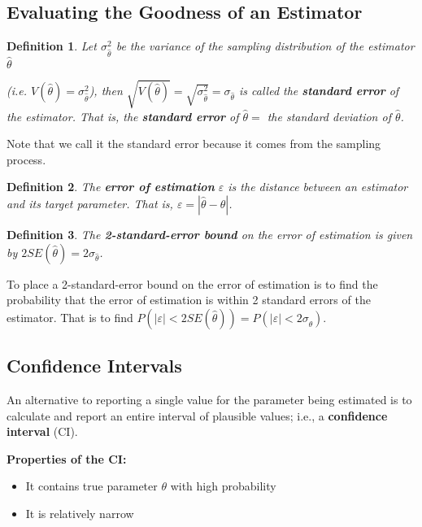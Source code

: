 \documentclass[a4paper,12pt]{article}
\theoremstyle{nonitalic}
\newtheorem{definition}{Definition}[subsection]
\begin{document}
    \subsection{Evaluating the Goodness of an Estimator}

    \begin{definition}
        Let \(\sigma^2_{\hat{\theta}}\) be the variance of the sampling distribution of the estimator \(\hat{\theta}\)

        (i.e. \(V(\hat{\theta}) = \sigma^2_{\hat{\theta}}\)), then \(\sqrt{V(\hat{\theta})} = \sqrt{\sigma^2_{\hat{\theta}}} = \sigma_{\hat{\theta}}\) is called the \textbf{standard error} of the estimator. That is, the \textbf{standard error} of \(\hat{\theta} =\) the standard deviation of \(\hat{\theta}\).
    \end{definition}
    Note that we call it the standard error because it comes from the sampling process.

    \bigskip

    \begin{definition}
        The \textbf{error of estimation} \(\varepsilon\) is the distance between an estimator and its target parameter. That is, \(\varepsilon = |\hat{\theta} - \theta|\).
    \end{definition}

    \bigskip

    \begin{definition}
        The \textbf{2-standard-error bound} on the error of estimation is given by $2SE(\hat{\theta}) = 2\sigma_{\hat{\theta}}$.
    \end{definition}
    To place a 2-standard-error bound on the error of estimation is to find the probability that the error of estimation is within 2 standard errors of the estimator. That is to find $P(|\varepsilon| < 2SE(\hat{\theta})) = P(|\varepsilon| < 2 \sigma_{\hat{\theta}})$.

    \newpage

    \subsection{Confidence Intervals}

    An alternative to reporting a single value for the parameter being estimated is to calculate and report an entire interval of plausible values; i.e., a \textbf{confidence interval} (CI).

    \textbf{Properties of the CI:}

    \begin{itemize}
        \item It contains true parameter \(\theta\) with high probability
        \item It is relatively narrow
    \end{itemize}
\end{document}
